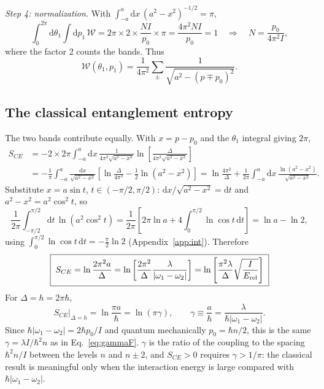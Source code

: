\documentclass[aps,pra,onecolumn,notitlepage,nofootinbib,11pt]{revtex4-2}
\newcommand{\dd}{\mathrm{d}}
\newcommand{\Erel}{E_{\rm rel}}
\newcommand{\Wc}{\mathcal{W}}
\begin{document}
\emph{Step 4: normalization.} With $\int_{-a}^{a}\dd x\,(a^{2}-x^{2})^{-1/2}=\pi$,
\begin{equation}
\int_{0}^{2\pi}\dd\theta_{1}\int\dd p_{1}\,\Wc=2\pi\times2\times\frac{NI}{p_{0}}\times\pi
=\frac{4\pi^{2}NI}{p_{0}}=1\quad\Longrightarrow\quad N=\frac{p_{0}}{4\pi^{2}I},
\end{equation}
where the factor 2 counts the bands. Thus
\begin{equation}
\Wc(\theta_{1},p_{1})=\frac{1}{4\pi^{2}}\sum_{\pm}\frac{1}{\sqrt{a^{2}-(p\mp p_{0})^{2}}}.
\label{eq:Wfinal}
\end{equation}

\subsection{The classical entanglement entropy}

The two bands contribute equally. With $x=p-p_{0}$ and the $\theta_{1}$ integral
giving $2\pi$,
\begin{align}
S_{CE}&=-2\times2\pi\int_{-a}^{a}\dd x\,\frac{1}{4\pi^{2}\sqrt{a^{2}-x^{2}}}
\ln\left[\frac{\Delta}{4\pi^{2}\sqrt{a^{2}-x^{2}}}\right]\nonumber\\
&=-\frac{1}{\pi}\int_{-a}^{a}\frac{\dd x}{\sqrt{a^{2}-x^{2}}}\left[\ln\frac{\Delta}{4\pi^{2}}
-\frac12\ln(a^{2}-x^{2})\right]
=\ln\frac{4\pi^{2}}{\Delta}+\frac{1}{2\pi}\int_{-a}^{a}\dd x\,
\frac{\ln(a^{2}-x^{2})}{\sqrt{a^{2}-x^{2}}}.
\end{align}
Substitute $x=a\sin t$, $t\in(-\pi/2,\pi/2)$: $\dd x/\sqrt{a^{2}-x^{2}}=\dd t$ and
$a^{2}-x^{2}=a^{2}\cos^{2}t$, so
\begin{equation}
\frac{1}{2\pi}\int_{-\pi/2}^{\pi/2}\dd t\,\ln(a^{2}\cos^{2}t)
=\frac{1}{2\pi}\left[2\pi\ln a+4\int_{0}^{\pi/2}\ln\cos t\,\dd t\right]
=\ln a-\ln2,
\end{equation}
using $\int_{0}^{\pi/2}\ln\cos t\,\dd t=-\frac{\pi}{2}\ln2$ (Appendix~\ref{app:int}).
Therefore
\begin{equation}
\boxed{\;S_{CE}=\ln\frac{2\pi^{2}a}{\Delta}
=\ln\left[\frac{2\pi^{2}}{\Delta}\frac{\lambda}{|\omega_{1}-\omega_{2}|}\right]
=\ln\left[\frac{\pi^{2}\lambda}{\Delta}\sqrt{\frac{I}{\Erel}}\right]\;}
\label{eq:SCE}
\end{equation}
For $\Delta=h=2\pi\hbar$,
\begin{equation}
S_{CE}\big|_{\Delta=h}=\ln\frac{\pi a}{\hbar}=\ln(\pi\gamma),\qquad
\gamma\equiv\frac{a}{\hbar}=\frac{\lambda}{\hbar|\omega_{1}-\omega_{2}|}.
\label{eq:SCEh}
\end{equation}
Since $\hbar|\omega_{1}-\omega_{2}|=2\hbar p_{0}/I$ and quantum mechanically
$p_{0}=\hbar n/2$, this is the same $\gamma=\lambda I/\hbar^{2}n$ as in
Eq.~\eqref{eq:gammaF}. $\gamma$ is the ratio of the coupling to the spacing
$\hbar^{2}n/I$ between the levels $n$ and $n\pm2$, and $S_{CE}>0$ requires
$\gamma>1/\pi$: the classical result is meaningful only when the interaction energy
is large compared with $\hbar|\omega_{1}-\omega_{2}|$.
\end{document}
